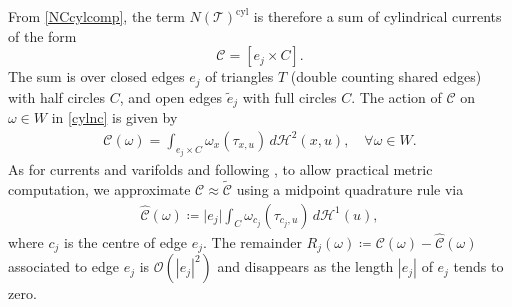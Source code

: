 \documentclass[sn-mathphys-num]{sn-jnl}%
\theoremstyle{thmstyleone}%
\theoremstyle{thmstyletwo}%
\theoremstyle{thmstylethree}%
\numberwithin{remark}{section}
\numberwithin{definition}{section}
\numberwithin{equation}{section}
\numberwithin{theorem}{section}
\newcommand{\R}{\ensuremath{\mathbb{R}}}%
\begin{document}
  From \cref{NCcylcomp}, the term $N(\mathcal{T})^{\mathrm{cyl}} $ is therefore a sum of cylindrical currents of the form
\begin{equation}\label{cylnc}
    \mathcal{C} = [e_j \times C].
\end{equation}
The sum is over closed edges $e_j$ of triangles $T$ (double counting shared edges) with half circles $C$, and open edges $\tilde e_j$ with full circles $C$. The action of $\mathcal{C}$ on $\omega \in W$ in \cref{cylnc} is given by
\begin{align*}
    \mathcal{C}(\omega) = \int_{e_j \times C}{ \omega_{x}(\tau_{x,u}) \,d\mathcal{H}^{2}(x,u) },\quad \forall\omega \in W.
\end{align*}
As for currents and varifolds and following \cite{NCpaper},  to allow practical metric computation,  we approximate $\mathcal C\approx \tilde{\mathcal C}$ using a midpoint quadrature rule via
\begin{align}\label{cylncapp}
   \hat{\mathcal{C}}(\omega) \coloneq  \lvert e_j \rvert \int_{C}{\omega_{c_j}(\tau_{c_j,u})\,d\mathcal{H}^{1}(u) },
\end{align}%
where  $c_j$ is the centre  of edge $e_j$. The remainder $R_j(\omega)\coloneq  \mathcal{C}(\omega) - \hat{\mathcal{C}}(\omega)$   associated to edge $e_j$ is $\mathcal{O}(|e_j|^2)$ and disappears as the length $|e_j|$ of $e_j$  tends to zero.


\end{document}
